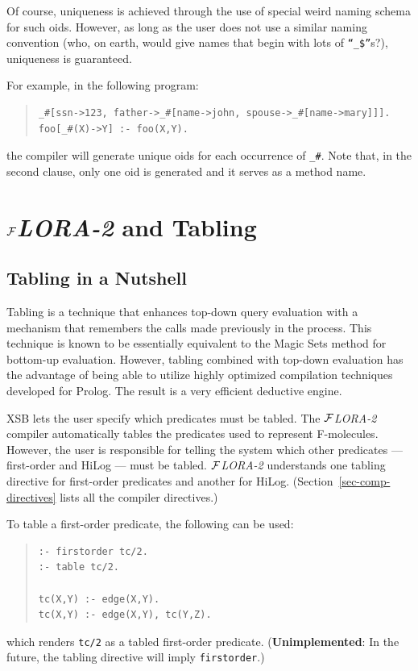 \documentclass[11pt]{article}
\newcommand{\FLORA}{{\mbox{${\cal F}${\small\it LORA}\rm\emph{-2}}}\xspace}
\begin{document}
Of course, uniqueness is achieved through the use of special weird naming
schema for such oids. However, as long as the user does not use a similar
naming convention (who, on earth, would give names that begin with lots of
{\tt ``\_\$''}s?), uniqueness is guaranteed.


For example, in the following program:
\begin{quote}
\begin{verbatim}
_#[ssn->123, father->_#[name->john, spouse->_#[name->mary]]].
foo[_#(X)->Y] :- foo(X,Y).
\end{verbatim}
\end{quote}
the compiler will generate unique oids for each occurrence of {\tt \_\#}.
Note that, in the second clause, only one oid is generated and it serves as
a method name.



\section{\FLORA and Tabling}\label{sec-tabling-flora}


\subsection{Tabling in a Nutshell}


%
Tabling is a technique that enhances top-down query evaluation with a
mechanism that remembers the calls made previously in the process.  This
technique is known to be essentially equivalent to the Magic Sets method
for bottom-up evaluation. However, tabling combined with top-down
evaluation has the advantage of being able to utilize highly optimized
compilation techniques developed for Prolog. The result is a very efficient
deductive engine.

XSB lets the user specify which predicates must be tabled.  The \FLORA
compiler automatically tables the predicates used to represent F-molecules.
However, the user is responsible for telling the system which other
predicates --- first-order and HiLog --- must be tabled.  \FLORA
understands one tabling directive for first-order predicates and another
for HiLog.  (Section~\ref{sec-comp-directives} lists all the compiler
directives.)

%
To table a first-order predicate, the following can be used:
\begin{quote}
\begin{verbatim}
:- firstorder tc/2.
:- table tc/2.

tc(X,Y) :- edge(X,Y).
tc(X,Y) :- edge(X,Y), tc(Y,Z).
\end{verbatim}
\end{quote}
which renders {\tt tc/2}  as a tabled first-order predicate.
({\bf Unimplemented}: In the future, the tabling directive will imply {\tt firstorder}.)
\end{document}

